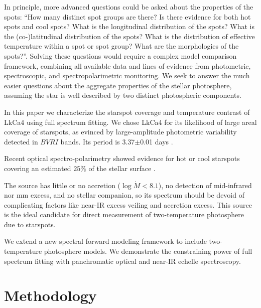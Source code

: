 \documentclass[onecolumn]{emulateapj}%
\newcommand{\name}{LkCa4 }
\begin{document}
In principle, more advanced questions could be asked about the properties of the spots: ``How many distinct spot groups are there?  Is there evidence for both hot spots and cool spots?  What is the longitudinal distribution of the spots?  What is the (co-)latitudinal distribution of the spots?  What is the distribution of effective temperature within a spot or spot group?  What are the morphologies of the spots?''.  Solving these questions would require a complex model comparison framework, combining all available data and lines of evidence from photometric, spectroscopic, and spectropolarimetric monitoring.  We seek to answer the much easier questions about the aggregate properties of the stellar photosphere, assuming the star is well described by two distinct photospheric components.  


In this paper we characterize the starspot coverage and temperature contrast of \name using full spectrum fitting.  We chose \name for its likelihood of large areal coverage of starspots, as evinced by large-amplitude photometric variability  detected in $BVRI$ bands.  Its period is 3.37$\pm$0.01 days \citep{1993AJ....106.1608V,1994IBVS.4042....1G,grankin08,xiao12}.  

Recent optical spectro-polarimetry showed evidence for hot or cool starspots covering an estimated $25\%$ of the stellar surface \citep{2014MNRAS.444.3220D}.  

The source has little or no accretion ($\log{\dot M} < 8.1$), no detection of mid-infrared nor mm excess, and no stellar companion, so its spectrum should be devoid of complicating factors like near-IR excess veiling and accretion excess.  This source is the ideal candidate for direct measurement of two-temperature photosphere due to starspots.

We extend a new spectral forward modeling framework to include two-temperature photosphere models.  We demonstrate the constraining power of full spectrum fitting with panchromatic optical and near-IR echelle spectroscopy.


\section{Methodology}\label{sec:methods} 
\end{document}
